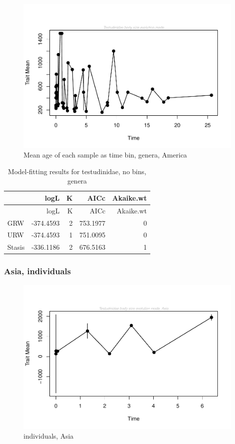 \documentclass[]{article}
\begin{document}
\begin{figure}[htbp]
\centering
\includegraphics{MA_JJ_files/figure-latex/paleoTS with different time bins, no bins, genera, America-1.pdf}
\caption{Mean age of each sample as time bin, genera, America}
\end{figure}

\begin{longtable}[]{@{}lrrrr@{}}
\caption{Model-fitting results for testudinidae, no bins,
genera}\tabularnewline
\toprule
& logL & K & AICc & Akaike.wt\tabularnewline
\midrule
\endfirsthead
\toprule
& logL & K & AICc & Akaike.wt\tabularnewline
\midrule
\endhead
GRW & -374.4593 & 2 & 753.1977 & 0\tabularnewline
URW & -374.4593 & 1 & 751.0095 & 0\tabularnewline
Stasis & -336.1186 & 2 & 676.5163 & 1\tabularnewline
\bottomrule
\end{longtable}

\newpage

\subsubsection{Asia, individuals}\label{asia-individuals}

\begin{figure}[htbp]
\centering
\includegraphics{MA_JJ_files/figure-latex/paleoTS, individuals, Asia-1.pdf}
\caption{individuals, Asia}
\end{figure}
\end{document}

